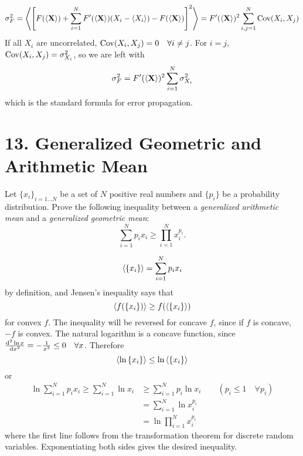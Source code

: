 \documentclass[a4paper,twoside]{article}
\begin{document}
\begin{itemize}
        \begin{problem}
            \begin{equation}
                \sigma^2_F = \ev{\left[ F(\ev{\vb{X}}) + \sum_{i=1}^{N} F'(\ev{\vb{X}}) (X_i - \ev{X_i}) - F(\ev{\vb{X}}) \right]^2} = F'(\ev{\vb{X}})^2 \sum_{i,j=1}^{N} \Cov(X_i, X_j)
            \end{equation}
            If all $ X_i $ are uncorrelated, $ \mathrm{Cov}(X_i, X_j) = 0 \quad \forall i \neq j $. For $ i = j $, $ \mathrm{Cov}(X_i, X_j) = \sigma^2_{X_i} $, so we are left with
            \begin{equation}
                \sigma^2_F = F'(\ev{\vb{X}})^2 \sum_{i=1}^{N} \sigma^2_{X_i}
            \end{equation}
            which is the standard formula for error propagation.
        \end{problem}
\end{itemize}

\section*{13. Generalized Geometric and Arithmetic Mean}
Let $ \{x_i\}_{i=1\ldots N} $ be a set of $ N $ positive real numbers and $ \{p_i\} $ be a probability distribution. Prove the following inequality between a \textit{generalized arithmetic mean} and a \textit{generalized geometric mean}:
\begin{equation}
    \sum_{i=1}^{N} p_i x_i \geq \prod_{i=1}^{N} x_i^{p_i}.
\end{equation}
\begin{problem}
    \begin{equation}
        \ev{\{x_i\}} = \sum_{i=1}^{N} p_i x_i
    \end{equation}
    by definition, and Jensen's inequality says that
    \begin{equation}
        \ev{f(\{x_i\})} \geq f(\ev{\{x_i\}})
    \end{equation}
    for convex $ f $. The inequality will be reversed for concave $ f $, since if $ f $ is concave, $ -f $ is convex. The natural logarithm is a concave function, since $ \dv[2]{\ln{x}}{x} = - \frac{1}{x^2} \leq 0 \quad \forall x $. Therefore
    \begin{equation}
        \ev{\ln{\{x_i\}}} \leq \ln{\ev{\{x_i\}}}
    \end{equation}
    or
    \begin{align}
        \ln{\sum_{i=1}^{N} p_i x_i} \geq \sum_{i=1}^{N}\ln{x_i} &\geq \sum_{i=1}^{N} p_i \ln{x_i} \qquad (p_i \leq 1 \quad \forall p_i) \\
        &= \sum_{i=1}^{N} \ln{x_i^{p_i}} \\
        &= \ln{\prod_{i=1}^{N} x_i^{p_i}}
    \end{align}
    where the first line follows from the transformation theorem for discrete random variables. Exponentiating both sides gives the desired inequality.
\end{problem}
\end{document}
